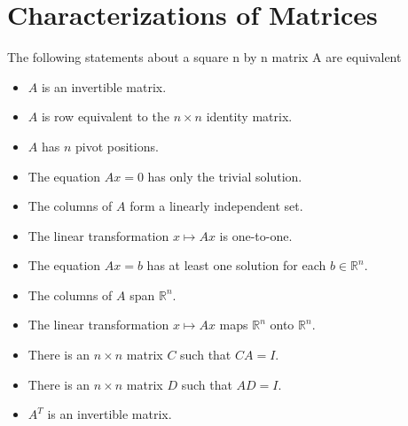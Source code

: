 \documentclass{report}
\begin{document}

\setcounter{section}{2}
\section{Characterizations of Matrices}

\setcounter{theorem}{7}
\begin{theorem}\end{theorem}
\begin{tcolorbox}[colback=blue!5!white, colframe=blue!75!black]
The following statements about a square n by n matrix A are equivalent
\begin{itemize}
    \item \( A \) is an invertible matrix.
    \item \( A \) is row equivalent to the \( n \times n \) identity matrix.
    \item \( A \) has \( n \) pivot positions.
    \item The equation \( Ax = 0 \) has only the trivial solution.
    \item The columns of \( A \) form a linearly independent set.
    \item The linear transformation \( x \mapsto Ax \) is one-to-one.
    \item The equation \( Ax = b \) has at least one solution for each \( b \in \mathbb{R}^n \).
    \item The columns of \( A \) span \( \mathbb{R}^n \).
    \item The linear transformation \( x \mapsto Ax \) maps \( \mathbb{R}^n \) onto \( \mathbb{R}^n \).
    \item There is an \( n \times n \) matrix \( C \) such that \( CA = I \).
    \item There is an \( n \times n \) matrix \( D \) such that \( AD = I \).
    \item \( A^T \) is an invertible matrix.
\end{itemize}
\end{tcolorbox}
\end{document}
